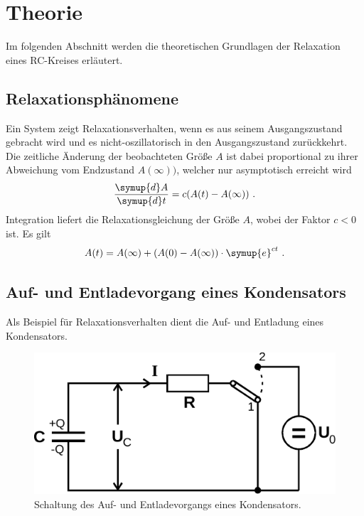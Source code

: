 \section{Theorie}
\label{sec:theorie}

    Im folgenden Abschnitt werden die theoretischen Grundlagen der Relaxation eines RC-Kreises erläutert.

\subsection{Relaxationsphänomene}

    Ein System zeigt Relaxationsverhalten,
    wenn es aus seinem Ausgangszustand gebracht wird und es nicht-oszillatorisch in den Ausgangszustand zurückkehrt.
    Die zeitliche Änderung der beobachteten Größe $A$ ist dabei proportional zu ihrer Abweichung vom Endzustand $A(\infty))$,
    welcher nur asymptotisch erreicht wird
    \begin{equation*}
        \frac{\symup{d}A}{\symup{d}t} = c(A(t) - A(\infty)) \ .
    \end{equation*}
    Integration liefert die Relaxationsgleichung der Größe $A$,
    wobei der Faktor $c < 0$ ist.
    Es gilt
    \begin{equation*}
        A(t) = A(\infty) + (A(0) - A(\infty)) \cdot \symup{e}^{ct} \ .
    \end{equation*}

\subsection{Auf- und Entladevorgang eines Kondensators}

    Als Beispiel für Relaxationsverhalten dient die Auf- und Entladung eines Kondensators.

    \begin{figure}
        \centering
        \includegraphics{content/img/Abb_1.pdf}
        \caption{Schaltung des Auf- und Entladevorgangs eines Kondensators.}
        \label{fig:schaltung_kondensatorEntAufladung}
    \end{figure}


